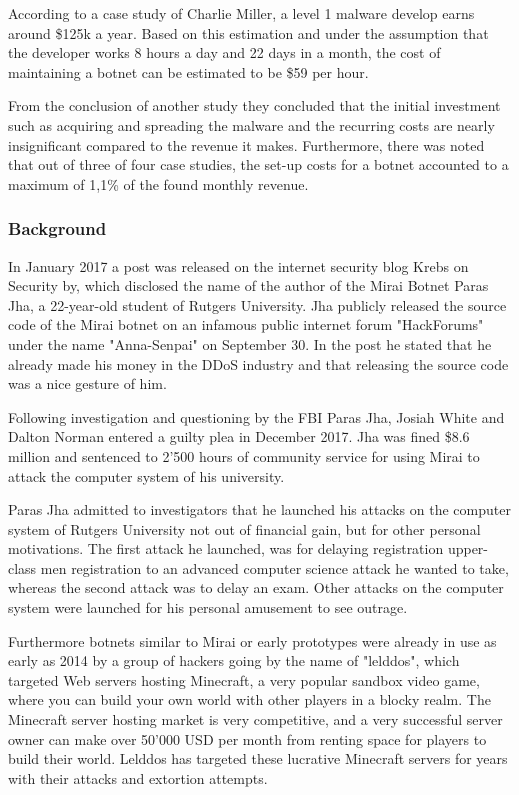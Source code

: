 According to a case study of Charlie Miller, a level 1 malware develop earns around \$125k a year. Based on this estimation and under the assumption that the developer works 8 hours a day and 22 days in a month, the cost of maintaining a botnet can be estimated to be \$59 per hour.

From the conclusion of another study they concluded that the initial investment such as acquiring and spreading the malware and the recurring costs are nearly insignificant compared to the revenue it makes. Furthermore, there was noted that out of three of four case studies, the set-up costs for a botnet accounted to a maximum of 1,1\% of the found monthly revenue.

	\subsubsection{Background}
	In January 2017 a post was released on the internet security blog Krebs on Security by, which disclosed the name of the author of the Mirai Botnet Paras Jha, a 22-year-old student of Rutgers University. Jha publicly released the source code of the Mirai botnet on an infamous public internet forum "HackForums" under the name "Anna-Senpai" on September 30. In the post he stated that he already made his money in the DDoS industry and that releasing the source code was a nice gesture of him. \cite{Krebs17}

Following investigation and questioning by the FBI Paras Jha, Josiah White and Dalton Norman entered a guilty plea in December 2017. \cite{USDepartment17} Jha was fined \$8.6 million and sentenced to 2'500 hours of community service for using Mirai to attack the computer system of his university. \cite{Krebs18}

Paras Jha admitted to investigators that he launched his attacks on the computer system of Rutgers University not out of financial gain, but for other personal motivations. The first attack he launched, was for delaying registration upper-class men registration to an advanced computer science attack he wanted to take, whereas the second attack was to delay an exam. Other attacks on the computer system were launched for his personal amusement to see outrage. \cite{Krebs18}

Furthermore botnets similar to Mirai or early prototypes were already in use as early as 2014 by a group of hackers going by the name of "lelddos", which targeted Web servers hosting Minecraft, a very popular sandbox video game, where you can build your own world with other players in a blocky realm. The Minecraft server hosting market is very competitive, and a very successful server owner can make over 50'000 USD per month from renting space for players to build their world. Lelddos has targeted these lucrative Minecraft servers for years with their attacks and extortion attempts. 

